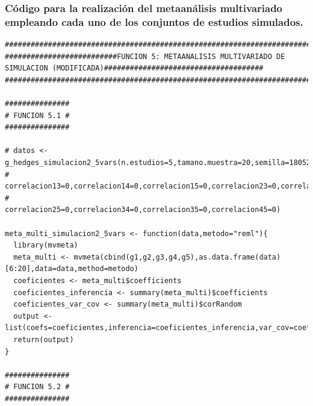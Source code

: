 \documentclass[a4paper,openright,12pt]{report}
\begin{document}
\subsubsection{Código para la realización del metaanálisis multivariado empleando cada uno de los conjuntos de estudios simulados.}
{\tiny
\begin{verbatim}
##############################################################################################################################
##########################FUNCION 5: METAANALISIS MULTIVARIADO DE SIMULACION (MODIFICADA)#####################################
##############################################################################################################################

###############
# FUNCION 5.1 #
###############

# datos <- g_hedges_simulacion2_5vars(n.estudios=5,tamano.muestra=20,semilla=18052013,replicaciones=5,correlacion12=0,
#                                     correlacion13=0,correlacion14=0,correlacion15=0,correlacion23=0,correlacion24=0,
#                                     correlacion25=0,correlacion34=0,correlacion35=0,correlacion45=0)

meta_multi_simulacion2_5vars <- function(data,metodo="reml"){
  library(mvmeta)
  meta_multi <- mvmeta(cbind(g1,g2,g3,g4,g5),as.data.frame(data)[6:20],data=data,method=metodo)
  coeficientes <- meta_multi$coefficients
  coeficientes_inferencia <- summary(meta_multi)$coefficients
  coeficientes_var_cov <- summary(meta_multi)$corRandom
  output <- list(coefs=coeficientes,inferencia=coeficientes_inferencia,var_cov=coeficientes_var_cov)
  return(output)
}

###############
# FUNCION 5.2 #
###############


\end{verbatim}}
\end{document}
